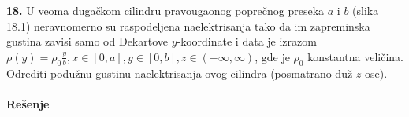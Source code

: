 \textbf{\Large 18.} U veoma duga\v{c}kom cilindru pravougaonog popre\v{c}nog preseka $a$ i $b$ (slika 18.1) neravnomerno su raspodeljena naelektrisanja tako da im zapreminska gustina zavisi samo od Dekartove $y$-koordinate i data je izrazom $\rho(y) = \rho_0\frac{y}{b},x\in[0,a],y\in[0,b],z\in(-\infty,\infty)$, gde je $\rho_0$ konstantna veli\v{c}ina. Odrediti podu\v{z}nu gustinu naelektrisanja ovog cilindra (posmatrano du\v{z} $z$-ose).
\\\\
\textbf{\Large Re\v{s}enje}
